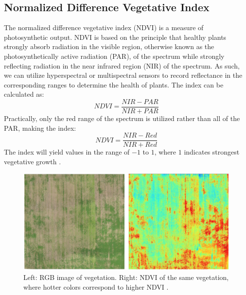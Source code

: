\subsection{Normalized Difference Vegetative Index}
The normalized difference vegetative index (NDVI) is a measure of photosynthetic output. NDVI is based on the principle that healthy plants strongly absorb radiation in the visible region, otherwise known as the photosynthetically active radiation (PAR), of the spectrum while strongly reflecting radiation in the near infrared region (NIR) of the spectrum. As such, we can utilize hyperspectral or multispectral sensors to record reflectance in the corresponding ranges to determine the health of plants. The index can be calculated as:
\begin{equation} NDVI = \frac{NIR - PAR}{NIR + PAR} \end{equation}
Practically, only the red range of the spectrum is utilized rather than all of the PAR, making the index: 
\begin{equation} NDVI = \frac{NIR - Red}{NIR + Red} \end{equation}
The index will yield values in the range of $-1$ to $1$, where $1$ indicates strongest vegetative growth \cite{Ryan}. 

\begin{figure}
    \centering
    \includegraphics[width=1.0\textwidth]{images/ndvi.png}
    \caption{Left: RGB image of vegetation. Right: NDVI of the same vegetation, where hotter colors correspond to higher NDVI \cite{Abuleil}.}
    \label{ndvi_map}
\end{figure}

